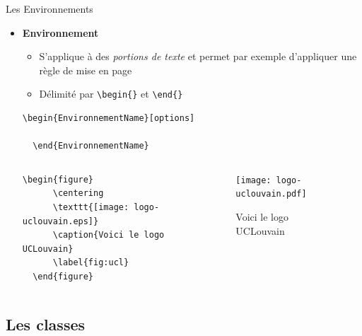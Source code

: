 \begin{frame}[fragile]{Les Environnements}
  \begin{itemize}
  \item \textbf{Environnement}
      \begin{itemize}
      \item S'applique à des \textit{portions de texte} et permet par exemple d'appliquer une règle de mise en page
      \item Délimité par \lstinline|\begin{}| et \lstinline|\end{}|
      \end{itemize}
      \begin{lstlisting}[style=nonumbers]
  \begin{EnvironnementName}[options]

  \end{EnvironnementName}
      \end{lstlisting}
      \begin{center}
        \begin{columns}
        \begin{column}{0.5\textwidth}
        \begin{lstlisting}[style=nonumbers]
  \begin{figure}
      \centering
      \texttt{[image: logo-uclouvain.eps]}
      \caption{Voici le logo UCLouvain}
      \label{fig:ucl}
  \end{figure}
        \end{lstlisting}
        \end{column}
        \begin{column}{0.5\textwidth}
        \begin{figure}[!ht]
            \centering
            \texttt{[image: logo-uclouvain.pdf]}
            \caption{Voici le logo UCLouvain}
            \label{fig:ucl}
        \end{figure}
        \end{column}
        \end{columns}
      \end{center}
  \end{itemize}
\end{frame}


\subsection{Les classes}

